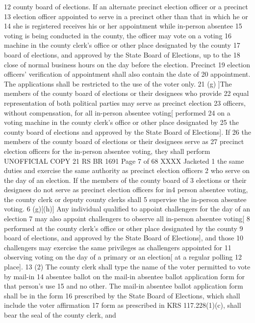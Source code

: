 12 county board of elections. If an alternate precinct election officer or a precinct
13 election officer appointed to serve in a precinct other than that in which he or
14 she is registered receives his or her appointment while in-person absentee
15 voting is being conducted in the county, the officer may vote on a voting
16 machine in the county clerk's office or other place designated by the county
17 board of elections, and approved by the State Board of Elections, up to the
18 close of normal business hours on the day before the election. Precinct
19 election officers' verification of appointment shall also contain the date of
20 appointment. The applications shall be restricted to the use of the voter only.
21 (g) ]The members of the county board of elections or their designees who provide
22 equal representation of both political parties may serve as precinct election
23 officers, without compensation, for all in-person absentee voting[ performed
24 on a voting machine in the county clerk's office or other place designated by
25 the county board of elections and approved by the State Board of Elections]. If
26 the members of the county board of elections or their designees serve as
27 precinct election officers for the in-person absentee voting, they shall perform 
UNOFFICIAL COPY 21 RS BR 1691
Page 7 of 68
XXXX Jacketed
1 the same duties and exercise the same authority as precinct election officers
2 who serve on the day of an election. If the members of the county board of
3 elections or their designees do not serve as precinct election officers for in4 person absentee voting, the county clerk or deputy county clerks shall
5 supervise the in-person absentee voting.
6 (g)[(h)] Any individual qualified to appoint challengers for the day of an election
7 may also appoint challengers to observe all in-person absentee voting[
8 performed at the county clerk's office or other place designated by the county
9 board of elections, and approved by the State Board of Elections], and those
10 challengers may exercise the same privileges as challengers appointed for
11 observing voting on the day of a primary or an election[ at a regular polling
12 place].
13 (2) The county clerk shall type the name of the voter permitted to vote by mail-in
14 absentee ballot on the mail-in absentee ballot application form for that person's use
15 and no other. The mail-in absentee ballot application form shall be in the form
16 prescribed by the State Board of Elections, which shall include the voter affirmation
17 form as prescribed in KRS 117.228(1)(c), shall bear the seal of the county clerk, and
